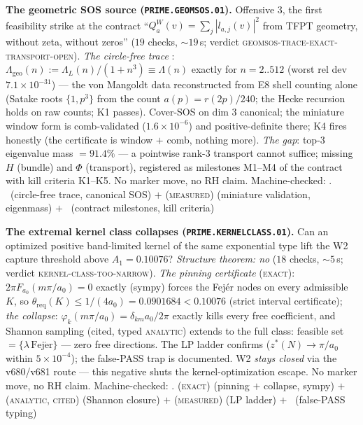 \documentclass[11pt,a4paper]{article}
\theoremstyle{definition}
\begin{document}
\par\smallskip\noindent\textbf{The geometric SOS source
(\texttt{PRIME.GEOMSOS.01}).}
Offensive 3, the first feasibility strike at the contract
``$Q^W_a(v)=\sum_j|l_{a,j}(v)|^2$ from TFPT geometry, without zeta,
without zeros'' ($19$ checks, ${\sim}19$\,s; verdict
\textsc{geomsos-trace-exact-transport-open}).  \emph{The circle-free
trace} \mE: $\Lambda_{\mathrm{geo}}(n):=\Lambda_L(n)/(1+n^3)\equiv
\Lambda(n)$ exactly for $n=2..512$ (worst rel dev
$7.1\times10^{-31}$) --- the von Mangoldt data reconstructed from E8
shell counting alone (Satake roots $\{1,p^3\}$ from the count
$a(p)=r(2p)/240$; the Hecke recursion holds on raw counts; K1
passes).  Cover-SOS on dim $3$ canonical; the miniature window form
is comb-validated ($1.6\times10^{-6}$) and positive-definite there;
K4 fires honestly (the certificate is window $+$ comb, nothing
more).  \emph{The gap}: top-3 eigenvalue mass $=91.4\%$ --- a
pointwise rank-3 transport cannot suffice; missing $H$ (bundle) and
$\Phi$ (transport), registered as milestones M1--M4 of the contract
with kill criteria K1--K5.  No marker move, no RH claim.
Machine-checked: .
\mE\ (circle-free trace, canonical SOS) $+$ (\textsc{measured})
(miniature validation, eigenmass) $+$ \mC\ (contract milestones,
kill criteria)
\par\smallskip

\par\smallskip\noindent\textbf{The extremal kernel class collapses
(\texttt{PRIME.KERNELCLASS.01}).}
Can an optimized positive band-limited kernel of the same exponential
type lift the W2 capture threshold above $A_1=0.10076$?
\emph{Structure theorem: no} ($18$ checks, ${\sim}5$\,s; verdict
\textsc{kernel-class-too-narrow}).  \emph{The pinning certificate}
(\textsc{exact}): $2\pi F_{a_0}(m\pi/a_0)=0$ exactly (sympy) forces
the Fej\'er nodes on every admissible $K$, so
$\theta_{\mathrm{req}}(K)\le1/(4a_0)=0.0901684<0.10076$ (strict
interval certificate); \emph{the collapse}:
$\varphi_k(m\pi/a_0)=\delta_{km}a_0/2\pi$ exactly kills every free
coefficient, and Shannon sampling (cited, typed \textsc{analytic})
extends to the full class: feasible set
$=\{\lambda\,\mathrm{Fej\acute er}\}$ --- zero free directions.  The
LP ladder confirms ($z^*(N)\to\pi/a_0$ within $5\times10^{-4}$); the
false-PASS trap is documented.  W2 \emph{stays closed} via the
v680/v681 route --- this negative shuts the kernel-optimization
escape.  No marker move, no RH claim.
Machine-checked: .
(\textsc{exact}) (pinning $+$ collapse, sympy) $+$
(\textsc{analytic, cited}) (Shannon closure) $+$
(\textsc{measured}) (LP ladder) $+$ \mC\ (false-PASS typing)
\par\smallskip
\end{document}
